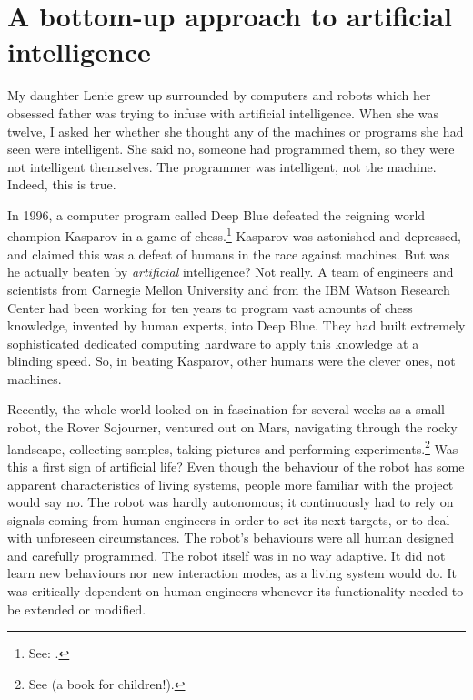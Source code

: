 \section{A bottom-up approach to artificial intelligence}

 My daughter Lenie grew up surrounded by computers and 
robots which her obsessed father was trying to infuse
with artificial intelligence. When she was twelve, I asked
her whether she thought any of the machines or 
programs she had seen were intelligent. 
She said no, someone had programmed them, so they were
not intelligent themselves. The programmer was 
intelligent, not the machine. Indeed, this is true. 

In 1996, a computer program called Deep Blue
defeated the reigning world champion Kasparov in a game of 
chess.\footnote{See: \cite{Newborn:1996}.}
Kasparov was astonished
and depressed, and claimed this was a defeat of humans in 
the 
race against machines. But was he actually beaten by {\itshape artificial}
intelligence? Not really. A team of engineers and scientists
from Carnegie Mellon University and from the IBM Watson 
Research Center had been working for ten years to program 
vast amounts of chess knowledge, invented by
human experts, into Deep Blue. They had built extremely 
sophisticated dedicated computing hardware to
apply this knowledge at a blinding speed. So, in beating Kasparov, 
other humans were the clever ones, not machines. 

Recently, the whole world looked on in fascination
for several weeks as a small robot, the Rover Sojourner, ventured
out on Mars, navigating through the rocky landscape, collecting
samples, taking pictures and performing 
experiments.\footnote{
See \cite{Wunsch:1998} (a book for children!).}
Was this a first sign of artificial life? Even though the 
behaviour of the robot has some apparent characteristics
of living systems, people more
familiar with the project would say no. 
The robot was hardly autonomous; it continuously had to rely
on signals coming from human engineers in order to set
its next targets, or to deal with unforeseen circumstances. 
The robot's behaviours were
all human designed and carefully programmed. The robot 
itself was in no way adaptive. It did not learn new behaviours
nor new interaction modes, as a living system would do.
It was critically dependent on human engineers whenever its
functionality needed to be extended or modified. 

